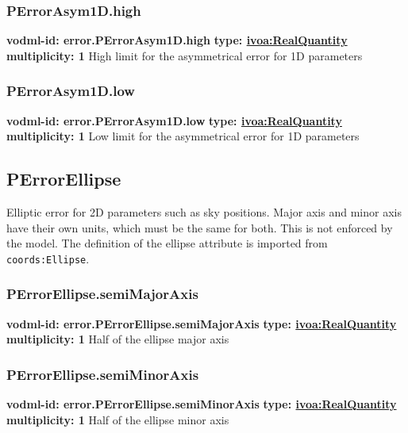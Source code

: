     \subsubsection{PErrorAsym1D.high}
    \textbf{vodml-id: error.PErrorAsym1D.high} \newline
    \textbf{type: \hyperref[sect:ivoa]{ivoa:RealQuantity}} \newline
    \textbf{multiplicity: 1} \newline
    High limit for the asymmetrical error for 1D parameters

    \subsubsection{PErrorAsym1D.low}
    \textbf{vodml-id: error.PErrorAsym1D.low} \newline
    \textbf{type: \hyperref[sect:ivoa]{ivoa:RealQuantity}} \newline
    \textbf{multiplicity: 1} \newline
    Low limit for the asymmetrical error for 1D parameters

  \subsection{PErrorEllipse}
    \label{sect:error.PErrorEllipse}
    Elliptic error for 2D parameters such as sky positions. Major axis and minor axis have their own units, which must be the same for both. This is not enforced by the model. The definition of the ellipse attribute is imported from \texttt{coords:Ellipse}.

    \subsubsection{PErrorEllipse.semiMajorAxis}
    \textbf{vodml-id: error.PErrorEllipse.semiMajorAxis} \newline
    \textbf{type: \hyperref[sect:ivoa]{ivoa:RealQuantity}} \newline
    \textbf{multiplicity: 1} \newline
    Half of the ellipse major axis

    \subsubsection{PErrorEllipse.semiMinorAxis}
    \textbf{vodml-id: error.PErrorEllipse.semiMinorAxis} \newline
    \textbf{type: \hyperref[sect:ivoa]{ivoa:RealQuantity}} \newline
    \textbf{multiplicity: 1} \newline
    Half of the ellipse minor axis

